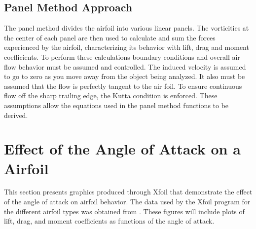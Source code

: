 \documentclass{article}
\begin{document}
\subsection{Panel Method Approach}
The panel method divides the airfoil into various linear panels. The vorticities at the center of each panel are then used to calculate and sum the forces experienced by the airfoil, characterizing its behavior with lift, drag and moment coefficients. To perform these calculations boundary conditions and overall air flow behavior must be assumed and controlled. The induced velocity is assumed to go to zero as you move away from the object being analyzed. It also must be assumed that the flow is perfectly tangent to the air foil. To ensure continuous flow off the sharp trailing edge, the Kutta condition is enforced. These assumptions allow the equations used in the panel method functions to be derived.

\section{Effect of the Angle of Attack on a Airfoil}
This section presents graphics produced through Xfoil that demonstrate the effect of the angle of attack on airfoil behavior. The data used by the Xfoil program for the different airfoil types was obtained from \cite{naca0012h}. These figures will include plots of lift, drag, and moment coefficients as functions of the angle of attack.
\end{document}
